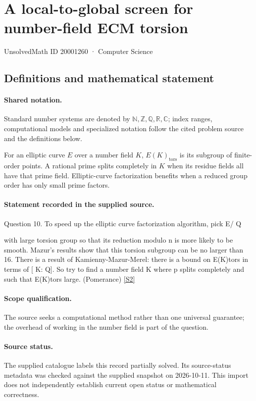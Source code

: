 \documentclass[11pt]{article}
\newcommand{\sref}[2]{\hyperlink{source:#1:#2}{[S#2]}}
\begin{document}
\setcounter{section}{20001259}
\section{A local-to-global screen for number-field ECM torsion}\label{20001260}
{\small\sffamily UnsolvedMath ID 20001260 · Computer Science}
\subsection{Definitions and mathematical statement}

\paragraph{Shared notation.}Standard number systems are denoted by $\mathbb N,\mathbb Z,\mathbb Q,\mathbb R,\mathbb C$; index ranges, computational models and specialized notation follow the cited problem source and the definitions below.


For an elliptic curve $E$ over a number field $K$, $E(K)_{\mathrm{tors}}$ is its subgroup of finite-order points. A rational prime splits completely in $K$ when its residue fields all have that prime field. Elliptic-curve factorization benefits when a reduced group order has only small prime factors.
\paragraph{Statement recorded in the supplied source.}
Question 10. To speed up the elliptic curve factorization algorithm, pick E/ Q

with large torsion group so that its reduction modulo n is more likely to be smooth. Mazur's results show that this torsion subgroup can be no larger than 16. There is a result of Kamienny-Mazur-Merel: there is a bound on E(K)tors in terms of [ K: Q]. So try to find a number field K where p splits completely and such that E(K)tors large. (Pomerance) \sref{20001260}{2}
\paragraph{Scope qualification.}
The source seeks a computational method rather than one universal guarantee; the overhead of working in the number field is part of the question.
\paragraph{Source status.}
The supplied catalogue labels this record partially solved. Its source-status metadata was checked against the supplied snapshot on 2026-10-11. This import does not independently establish current open status or mathematical correctness.
\end{document}
